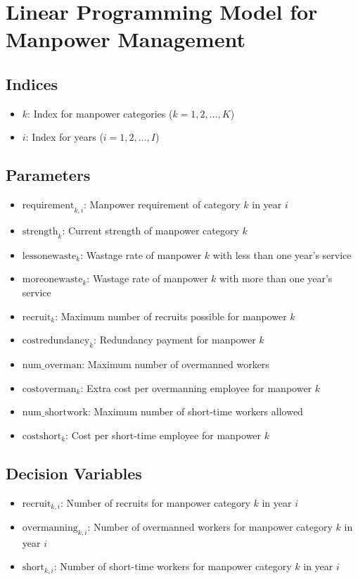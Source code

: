 \documentclass{article}
\begin{document}
\section*{Linear Programming Model for Manpower Management}

\subsection*{Indices}
\begin{itemize}
    \item \( k \): Index for manpower categories (\( k = 1, 2, \ldots, K \))
    \item \( i \): Index for years (\( i = 1, 2, \ldots, I \))
\end{itemize}

\subsection*{Parameters}
\begin{itemize}
    \item \( \text{requirement}_{k,i} \): Manpower requirement of category \( k \) in year \( i \)
    \item \( \text{strength}_{k} \): Current strength of manpower category \( k \)
    \item \( \text{lessonewaste}_{k} \): Wastage rate of manpower \( k \) with less than one year's service
    \item \( \text{moreonewaste}_{k} \): Wastage rate of manpower \( k \) with more than one year's service
    \item \( \text{recruit}_{k} \): Maximum number of recruits possible for manpower \( k \)
    \item \( \text{costredundancy}_{k} \): Redundancy payment for manpower \( k \)
    \item \( \text{num\_overman} \): Maximum number of overmanned workers
    \item \( \text{costoverman}_{k} \): Extra cost per overmanning employee for manpower \( k \)
    \item \( \text{num\_shortwork} \): Maximum number of short-time workers allowed
    \item \( \text{costshort}_{k} \): Cost per short-time employee for manpower \( k \)
\end{itemize}

\subsection*{Decision Variables}
\begin{itemize}
    \item \( \text{recruit}_{k,i} \): Number of recruits for manpower category \( k \) in year \( i \)
    \item \( \text{overmanning}_{k,i} \): Number of overmanned workers for manpower category \( k \) in year \( i \)
    \item \( \text{short}_{k,i} \): Number of short-time workers for manpower category \( k \) in year \( i \)
\end{itemize}
\end{document}

